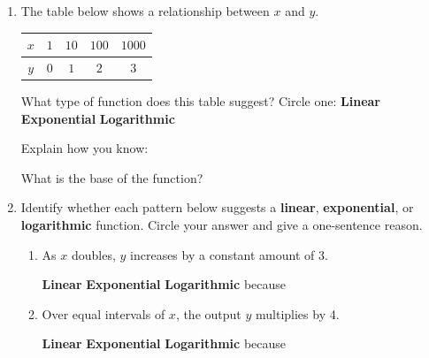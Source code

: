 \documentclass[10pt]{article}
\begin{document}
\namedateperiod

\vspace{0.15in}

\begin{enumerate}[leftmargin=1.8em, itemsep=16pt]

\item The table below shows a relationship between $x$ and $y$.

\vspace{6pt}
\begin{center}
\renewcommand{\arraystretch}{1.8}
\begin{tabular}{|c|c|c|c|c|}
\hline
\rowcolor{sky}
$x$ & $1$ & $10$ & $100$ & $1000$ \\
\hline
$y$ & $0$ & $1$  & $2$   & $3$ \\
\hline
\end{tabular}
\end{center}

\vspace{4pt}
What type of function does this table suggest? Circle one: \quad
\textbf{Linear} \quad \textbf{Exponential} \quad \textbf{Logarithmic}

\vspace{4pt}
Explain how you know: \writeline

\vspace{4pt}
What is the base of the function? \blank{2cm}

\item Identify whether each pattern below suggests a \textbf{linear}, \textbf{exponential},
      or \textbf{logarithmic} function. Circle your answer and give a one-sentence reason.

\vspace{6pt}
\begin{enumerate}[leftmargin=1.5em, itemsep=10pt, label=\alph*.]
  \item As $x$ doubles, $y$ increases by a constant amount of 3.

  \vspace{2pt}
  \textbf{Linear} \quad \textbf{Exponential} \quad \textbf{Logarithmic} \quad
  because \writeline

  \item Over equal intervals of $x$, the output $y$ multiplies by 4.

  \vspace{2pt}
  \textbf{Linear} \quad \textbf{Exponential} \quad \textbf{Logarithmic} \quad
  because \writeline
\end{enumerate}


\end{enumerate}
\end{document}
